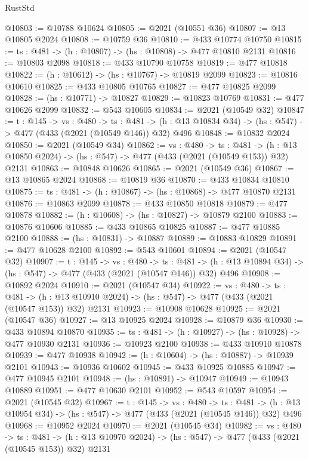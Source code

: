 \begin{lexlean}{RustStd}
\begin{coremodule}
{\begin{coremodule}
{{{{{{{{{{{{{{{{@10803 := @10788 @10624
@10805 := @2021 (@10551 @36)
@10807 := @13 @10805 @2024
@10808 := @10759 @36
@10810 := @433 @10774 @10750
@10815 := {ts : @481} -> (h : @10807) -> (hs : @10808) -> @477 @10810 @2131
@10816 := @10803 @2098
@10818 := @433 @10790 @10758
@10819 := @477 @10818
@10822 := (h : @10612) -> (hs : @10767) -> @10819 @2099
@10823 := @10816 @10610
@10825 := @433 @10805 @10765
@10827 := @477 @10825 @2099
@10828 := (hs : @10771) -> @10827
@10829 := @10823 @10769
@10831 := @477 @10626 @2099
@10832 := @543 @10605
@10834 := @2021 (@10549 @32)
@10847 := {t : @145} ->
  {vs : @480} ->
  {ts : @481} -> (h : @13 @10834 @34) -> (hs : @547) -> @477 (@433 (@2021 (@10549 @146)) @32) @496
@10848 := @10832 @2024
@10850 := @2021 (@10549 @34)
@10862 := {vs : @480} ->
  {ts : @481} ->
  (h : @13 @10850 @2024) -> (hs : @547) -> @477 (@433 (@2021 (@10549 @153)) @32) @2131
@10863 := @10848 @10626
@10865 := @2021 (@10549 @36)
@10867 := @13 @10865 @2024
@10868 := @10819 @36
@10870 := @433 @10834 @10810
@10875 := {ts : @481} -> (h : @10867) -> (hs : @10868) -> @477 @10870 @2131
@10876 := @10863 @2099
@10878 := @433 @10850 @10818
@10879 := @477 @10878
@10882 := (h : @10608) -> (hs : @10827) -> @10879 @2100
@10883 := @10876 @10606
@10885 := @433 @10865 @10825
@10887 := @477 @10885 @2100
@10888 := (hs : @10831) -> @10887
@10889 := @10883 @10829
@10891 := @477 @10628 @2100
@10892 := @543 @10601
@10894 := @2021 (@10547 @32)
@10907 := {t : @145} ->
  {vs : @480} ->
  {ts : @481} -> (h : @13 @10894 @34) -> (hs : @547) -> @477 (@433 (@2021 (@10547 @146)) @32) @496
@10908 := @10892 @2024
@10910 := @2021 (@10547 @34)
@10922 := {vs : @480} ->
  {ts : @481} ->
  (h : @13 @10910 @2024) -> (hs : @547) -> @477 (@433 (@2021 (@10547 @153)) @32) @2131
@10923 := @10908 @10628
@10925 := @2021 (@10547 @36)
@10927 := @13 @10925 @2024
@10928 := @10879 @36
@10930 := @433 @10894 @10870
@10935 := {ts : @481} -> (h : @10927) -> (hs : @10928) -> @477 @10930 @2131
@10936 := @10923 @2100
@10938 := @433 @10910 @10878
@10939 := @477 @10938
@10942 := (h : @10604) -> (hs : @10887) -> @10939 @2101
@10943 := @10936 @10602
@10945 := @433 @10925 @10885
@10947 := @477 @10945 @2101
@10948 := (hs : @10891) -> @10947
@10949 := @10943 @10889
@10951 := @477 @10630 @2101
@10952 := @543 @10597
@10954 := @2021 (@10545 @32)
@10967 := {t : @145} ->
  {vs : @480} ->
  {ts : @481} -> (h : @13 @10954 @34) -> (hs : @547) -> @477 (@433 (@2021 (@10545 @146)) @32) @496
@10968 := @10952 @2024
@10970 := @2021 (@10545 @34)
@10982 := {vs : @480} ->
  {ts : @481} ->
  (h : @13 @10970 @2024) -> (hs : @547) -> @477 (@433 (@2021 (@10545 @153)) @32) @2131
}}}}}}}}}}}}}}}}
\end{coremodule}}
\end{coremodule}
\end{lexlean}
